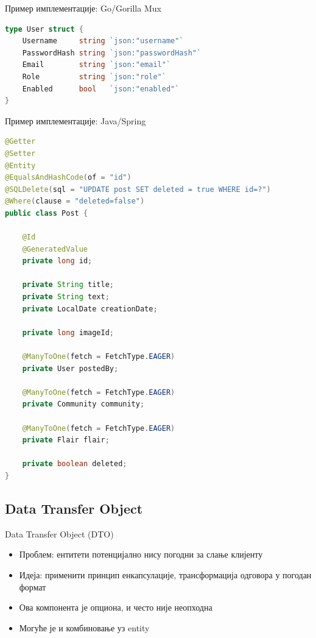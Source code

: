 \documentclass[aspectratio=169]{beamer}
\begin{document}
    \begin{frame}[fragile]{Пример имплементације: Go/Gorilla Mux}
        \begin{adjustbox}{width=\textwidth,height=\textheight,keepaspectratio}
            \begin{lstlisting}[language=go]
type User struct {
    Username     string `json:"username"`
    PasswordHash string `json:"passwordHash"`
    Email        string `json:"email"`
    Role         string `json:"role"`
    Enabled      bool   `json:"enabled"`
}
            \end{lstlisting}
        \end{adjustbox}
    \end{frame}
    
    \begin{frame}[fragile]{Пример имплементације: Java/Spring}
        \begin{adjustbox}{width=\textwidth,height=0.4\textheight,keepaspectratio}
            \begin{lstlisting}[language=java]
@Getter
@Setter
@Entity
@EqualsAndHashCode(of = "id")
@SQLDelete(sql = "UPDATE post SET deleted = true WHERE id=?")
@Where(clause = "deleted=false")
public class Post {

    @Id
    @GeneratedValue
    private long id;

    private String title;
    private String text;
    private LocalDate creationDate;

    private long imageId;

    @ManyToOne(fetch = FetchType.EAGER)
    private User postedBy;

    @ManyToOne(fetch = FetchType.EAGER)
    private Community community;

    @ManyToOne(fetch = FetchType.EAGER)
    private Flair flair;

    private boolean deleted;
}
            \end{lstlisting}
        \end{adjustbox}
    \end{frame}
    
    \subsection[]{Data Transfer Object}
    
    \begin{frame}{Data Transfer Object (DTO)}
        \begin{itemize}
            \item Проблем: ентитети потенцијално нису погодни за слање клијенту
            \item Идеја: применити принцип енкапсулације, трансформација одговора у погодан формат
            \item Ова компонента је опциона, и често није неопходна
            \item Могуће је и комбиновање уз entity
        \end{itemize}
    \end{frame}
    
\end{document}
